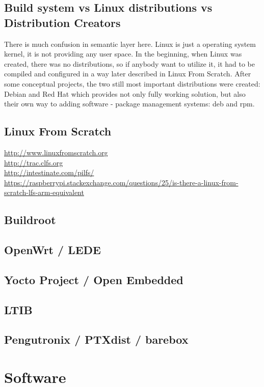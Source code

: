 \documentclass[printmode]{mgr}
\begin{document}
\section{Build system vs Linux distributions vs Distribution Creators}
There is much confusion in semantic layer here. Linux is just a operating system kernel, it is not providing any user space.
In the beginning, when Linux was created, there was no distributions, so if anybody want to utilize it, it had to be compiled and configured in a way later described in Linux From Scratch.
After some conceptual projects, the two still most important distributions were created: Debian and Red Hat which provides not only fully working solution, but also their own way to adding software - package management systems: deb and rpm. 

\section{Linux From Scratch}

\url{http://www.linuxfromscratch.org}\\
\url{http://trac.clfs.org}\\
\url{http://intestinate.com/pilfs/}\\
\url{https://raspberrypi.stackexchange.com/questions/25/is-there-a-linux-from-scratch-lfs-arm-equivalent}

\section{Buildroot}

\section{OpenWrt / LEDE}

\section{Yocto Project / Open Embedded}

\section{LTIB}

\section{Pengutronix / PTXdist / barebox}

\chapter{Software}
\label{chapter:software}
\end{document}
